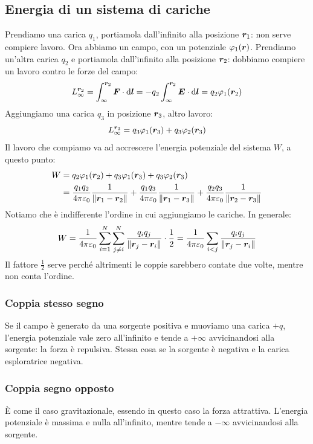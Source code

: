 \subsection{Energia di un sistema di cariche}
Prendiamo una carica $q_1$, portiamola dall'infinito alla posizione $\boldsymbol{r}_1$: non serve compiere lavoro. Ora abbiamo un campo, con un potenziale $\varphi_1(\boldsymbol{r})$. Prendiamo un'altra carica $q_2$ e portiamola dall'infinito alla posizione $\boldsymbol{r}_2$: dobbiamo compiere un lavoro contro le forze del campo:
\[L_\infty^{\boldsymbol{r}_2}=\int_\infty^{\boldsymbol{r}_2}\boldsymbol{F}\cdot\mathrm{d} \boldsymbol{l}=-q_2\int_\infty^{\boldsymbol{r}_2} \boldsymbol{E}\cdot\mathrm{d} \boldsymbol{l}=q_2\varphi_1(\boldsymbol{r}_2)\]
Aggiungiamo una carica $q_3$ in posizione $\boldsymbol{r}_3$, altro lavoro:
\[L_\infty^{\boldsymbol{r}_3}=q_3\varphi_1(\boldsymbol{r}_3)+q_3\varphi_2(\boldsymbol{r}_3)\]
Il lavoro che compiamo va ad accrescere l'energia potenziale del sistema $W$, a questo punto:
\begin{align*}
  W & =q_2\varphi_1(\boldsymbol{r}_2)+q_3\varphi_1(\boldsymbol{r}_3)+q_3\varphi_2(\boldsymbol{r}_3)                                                                  \\
    & =\frac{q_1q_2}{4\pi\varepsilon_0}\frac{1}{\left\lVert\boldsymbol{r}_1-\boldsymbol{r}_2\right\rVert}+\frac{q_1q_3}{4\pi\varepsilon_0}\frac{1}{\left\lVert\boldsymbol{r}_1-\boldsymbol{r}_3\right\rVert}+
  \frac{q_2q_3}{4\pi\varepsilon_0}\frac{1}{\left\lVert\boldsymbol{r}_2-\boldsymbol{r}_3\right\rVert}
\end{align*}
Notiamo che è indifferente l'ordine in cui aggiungiamo le cariche. In generale:
\begin{equation}
  \label{energia_sistema_cariche}
  W=\frac{1}{4\pi\varepsilon_0}\sum_{i=1}^{N}\sum_{j\neq i}^{N}\frac{q_iq_j}{\left\lVert\boldsymbol{r}_j-\boldsymbol{r}_i\right\rVert}\cdot\frac{1}{2}=\frac{1}{4\pi\varepsilon_0}\sum_{i<j}\frac{q_iq_j}{\left\lVert\boldsymbol{r}_j-\boldsymbol{r}_i\right\rVert}
\end{equation}
Il fattore $\frac{1}{2}$ serve perché altrimenti le coppie sarebbero contate due volte, mentre non conta l'ordine.
\subsubsection{Coppia stesso segno}
Se il campo è generato da una sorgente positiva e muoviamo una carica $+q$, l'energia potenziale vale zero all'infinito e tende a $+\infty$ avvicinandosi alla sorgente: la forza è repulsiva. Stessa cosa se la sorgente è negativa e la carica esploratrice negativa.
\subsubsection{Coppia segno opposto}
\`E come il caso gravitazionale, essendo in questo caso la forza attrattiva. L'energia potenziale è massima e nulla all'infinito, mentre tende a $-\infty$ avvicinandosi alla sorgente.
